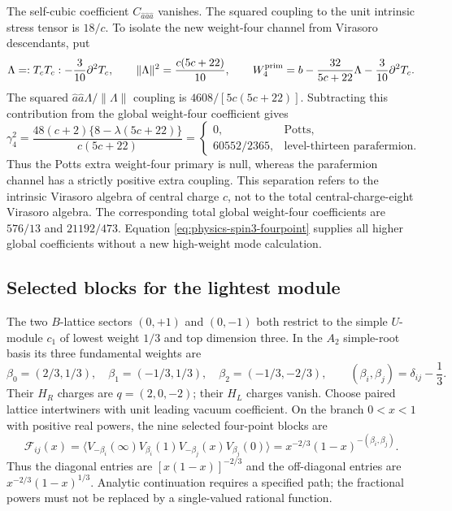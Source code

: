 The self-cubic coefficient $C_{\widehat a\widehat a\widehat a}$
vanishes.  The squared coupling to the unit intrinsic stress tensor is
$18/c$.  To isolate the new weight-four channel from Virasoro
descendants, put
\begin{equation}
 \Lambda=:T_cT_c:-\frac3{10}\partial^2T_c,
 \qquad \|\Lambda\|^2=\frac{c(5c+22)}{10},
 \qquad W_4^{\rm prim}
 =b-\frac{32}{5c+22}\Lambda-\frac3{10}\partial^2T_c.
\end{equation}
The squared $\widehat a\widehat a\Lambda/\|\Lambda\|$ coupling
is $4608/[5c(5c+22)]$.  Subtracting this contribution from the global
weight-four coefficient gives
\begin{equation}
 \gamma_4^2
 =\frac{48(c+2)\{8-\lambda(5c+22)\}}{c(5c+22)}
 =\begin{cases}
 0,&\text{Potts},\\
 60552/2365,&\text{level-thirteen parafermion}.
 \end{cases}
\end{equation}
Thus the Potts extra weight-four primary is null, whereas the
parafermion channel has a strictly positive extra coupling.  This
separation refers to the intrinsic Virasoro algebra of central charge
$c$, not to the total central-charge-eight Virasoro algebra.  The
corresponding total global weight-four coefficients are $576/13$ and
$21192/473$.  Equation \eqref{eq:physics-spin3-fourpoint} supplies all
higher global coefficients without a new high-weight mode calculation.

\subsection{Selected blocks for the lightest module}

The two $B$-lattice sectors $(0,+1)$ and $(0,-1)$ both restrict to the
simple $U$-module $c_1$ of lowest weight $1/3$ and top dimension three.
In the $A_2$ simple-root basis its three fundamental weights are
\begin{equation}
 \beta_0=(2/3,1/3),\quad
 \beta_1=(-1/3,1/3),\quad
 \beta_2=(-1/3,-2/3),\qquad
 (\beta_i,\beta_j)=\delta_{ij}-\frac13.
\end{equation}
Their $H_R$ charges are $q=(2,0,-2)$; their $H_L$ charges vanish.
Choose paired lattice intertwiners with unit leading vacuum coefficient.
On the branch $0<x<1$ with positive real powers, the nine selected
four-point blocks are
\begin{equation}
 \mathcal F_{ij}(x)
 =\langle V_{-\beta_i}(\infty)V_{\beta_i}(1)
           V_{-\beta_j}(x)V_{\beta_j}(0)\rangle
 =\boxed{x^{-2/3}(1-x)^{-(\beta_i,\beta_j)}}.
 \label{eq:physics-lightest-block}
\end{equation}
Thus the diagonal entries are $[x(1-x)]^{-2/3}$ and the off-diagonal
entries are $x^{-2/3}(1-x)^{1/3}$.  Analytic continuation requires a
specified path; the fractional powers must not be replaced by a
single-valued rational function.

